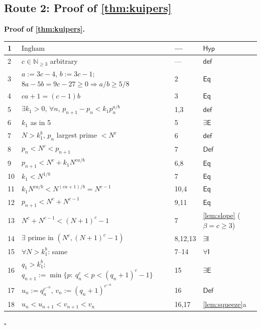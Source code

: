 \documentclass[11pt,reqno]{amsart}
\theoremstyle{blueplain}
\renewcommand{\qedsymbol}{\textcolor{proofqed}{\ensuremath{\square}}}
\renewenvironment{proof}[1][Proof]{\par\noindent\textbf{\textcolor{proofhead}{#1.}}\par\nobreak}{\par\nobreak\hfill\qedsymbol}
\numberwithin{equation}{section}
\begin{document}
\subsection{Route 2: Proof of \cref{thm:kuipers}}

\begin{proof}[\textbf{Proof of \cref{thm:kuipers}}]
	\label{proof:kuipers}
	{\scriptsize
		\begin{tabular}{|m{0.7cm}|m{12cm}|m{1.4cm}|m{2.5cm}|}
			\hline
			1 & $\text{Ingham}$ & --- & $\mathsf{Hyp}$ \\ \hline
			2 & $c\in\mathbb{N}_{\geq 3}$ arbitrary & --- & $\mathsf{def}$ \\ \hline
			3 & $a:=3c-4$, $b:=3c-1$; $8a-5b=9c-27\ge 0\Rightarrow a/b\ge 5/8$ & 2 & $\mathsf{Eq}$ \\ \hline
			4 & $ca+1=(c-1)b$ & 3 & $\mathsf{Eq}$ \\ \hline
			5 & $\exists k_1>0$, $\forall n$, $p_{n+1}-p_n<k_1 p_n^{a/b}$ & 1,3 & $\mathsf{def}$ \\ \hline
			6 & $k_1$ as in 5 & 5 & $\exists\mathsf{E}$ \\ \hline
			7 & $N>k_1^{b}$, $p_n$ largest prime $<N^{c}$ & 6 & $\mathsf{def}$ \\ \hline
			8 & $p_n<N^{c}<p_{n+1}$ & 7 & $\mathsf{Def}$ \\ \hline
			9 & $p_{n+1}<N^{c}+k_1 N^{ca/b}$ & 6,8 & $\mathsf{Eq}$ \\ \hline
			10 & $k_1<N^{1/b}$ & 7 & $\mathsf{Eq}$ \\ \hline
			11 & $k_1 N^{ca/b}<N^{(ca+1)/b}=N^{c-1}$ & 10,4 & $\mathsf{Eq}$ \\ \hline
			12 & $p_{n+1}<N^{c}+N^{c-1}$ & 9,11 & $\mathsf{Eq}$ \\ \hline
			13 & $N^{c}+N^{c-1}<(N+1)^{c}-1$ & 7 & \cref{lem:slope} ($\beta=c\ge 3$) \\ \hline
			14 & $\exists$ prime in $(N^{c},(N+1)^{c}-1)$ & 8,12,13 & $\exists\mathsf{I}$ \\ \hline
			15 & $\forall N>k_1^{b}$: same & 7--14 & $\forall\mathsf{I}$ \\ \hline
			16 & $q_1>k_1^{b}$; $q_{n+1}:=\min\{p:\ q_n^{c}<p<(q_n+1)^{c}-1\}$ & 15 & $\exists\mathsf{E}$ \\ \hline
			17 & $u_n:=q_n^{c^{-n}}$, $v_n:=(q_n+1)^{c^{-n}}$ & 16 & $\mathsf{Def}$ \\ \hline
			18 & $u_n<u_{n+1}<v_{n+1}<v_n$ & 16,17 & \cref{lem:squeeze}a \\ \hline

\end{tabular}}
\end{proof}
\end{document}
